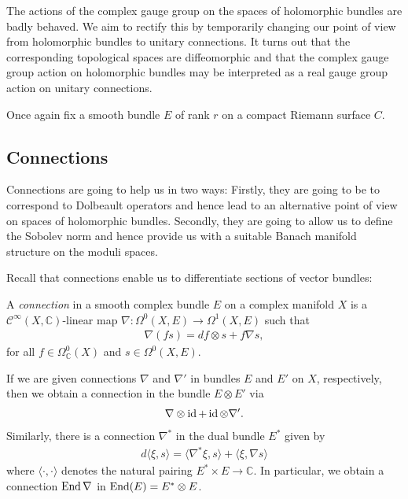 \documentclass[12pt]{ociamthesis}  %
\begin{document}
The actions of the complex gauge group on the spaces of holomorphic
bundles are badly behaved. We aim to rectify this by temporarily
changing our point of view from holomorphic bundles to unitary
connections. It turns out that the corresponding topological spaces
are diffeomorphic and that the complex gauge group action on holomorphic bundles
may be interpreted as a real gauge group action on unitary connections.

Once again fix a smooth bundle $E$ of rank $r$ on a compact
Riemann surface $C$.

\subsection{Connections}

Connections are going to help us in two ways: Firstly, they are going to
be to correspond to Dolbeault operators and hence lead to an
alternative point of view on spaces of holomorphic bundles.
Secondly, they are going to allow us to define the Sobolev norm and
hence provide us with a suitable Banach manifold structure on
the moduli spaces.

Recall that connections enable us to differentiate sections of
vector bundles:

\begin{definition}
  A \emph{connection} in a smooth complex bundle $E$ on
  a complex manifold $X$ is a $\mathscr C^\infty(X,\mathbb C)$-linear
  map $\nabla : \Omega^0(X,E) \to \Omega^1(X,E)$
  such that
  \begin{align*}
    \nabla (fs) = df \otimes s + f\nabla s,
  \end{align*}
  for all $f\in \Omega^0_{\mathbb C}(X)$ and $s\in\Omega^0(X,E)$.
\end{definition}

\begin{example}\label{ex:connection_on_end}
  If we are given connections $\nabla$ and $\nabla'$ in bundles $E$ and $E'$ on $X$,
  respectively, then we obtain a connection in the bundle $E\otimes E'$ via
  \begin{align*}
    \nabla \otimes \operatorname{id} + \operatorname{id} \otimes \nabla'.
  \end{align*}
  Similarly, there is a connection $\nabla^*$ in the dual bundle $E^*$ given by
  \begin{align*}
    d\langle \xi,s\rangle
    = \langle \nabla^*\xi, s \rangle + \langle \xi,\nabla s\rangle
  \end{align*}
  where $\langle\cdot,\cdot\rangle$ denotes the natural pairing $E^*\times E\to\mathbb{C}$.
  In particular, we obtain a connection $\operatorname{End}\nabla$ in $\operatorname{End}(E) = E^* \otimes E$.
\end{example}
\end{document}
